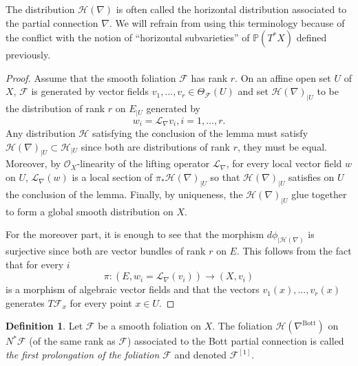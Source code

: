 \documentclass[12pt]{amsart}
\renewcommand{\P}{\mathbb{P}}
\theoremstyle{definition}
\newtheorem{definition}{Definition}[subsection]
\theoremstyle{plain}
\theoremstyle{exampstyle}
\theoremstyle{exampstyle}\newtheorem{thmxbis}{Theorem}
\numberwithin{equation}{section}
\theoremstyle{remark}
\begin{document}
The distribution $\mathcal H(\nabla)$ is often called the horizontal distribution associated to the partial connection $\nabla$. We will refrain from using this terminology because of the conflict with the notion of ``horizontal subvarieties'' of $\P(T^\ast X)$ defined previously.  
\begin{proof}
Assume that the smooth foliation $\mathcal F$ has rank $r$. 
On an affine open set $U$ of $X$, $\mathcal F$ is generated by vector fields $v_1,\ldots, v_r \in \Theta_\mathcal F(U)$ and set $\mathcal H(\nabla)_{\mid U}$ to be the distribution of rank $r$ on $E_{\mid U}$ generated by 
$$w_i = \mathcal L_\nabla v_i, i = 1,\ldots, r.$$
Any distribution $\mathcal H$ satisfying the conclusion of the lemma must satisfy $\mathcal H(\nabla)_{\mid U} \subset \mathcal H_{\mid U}$ since both are distributions of rank $r$, they must be equal. Moreover, by $\mathcal O_X$-linearity of the lifting operator $\mathcal L_\nabla$, for every local vector field $w$ on $U$, $\mathcal L_\nabla(w)$ is a local section of $\pi_\ast \mathcal H(\nabla)_{\mid U}$ so that $\mathcal H(\nabla)_{\mid U}$ satisfies on $U$ the conclusion of the lemma. Finally, by uniqueness, the $\mathcal H(\nabla)_{\mid U}$ glue together to form a global smooth distribution on $X$. 

For the moreover part, it is enough to see that the morphism $d\phi_{\mid \mathcal H(\nabla)}$ is surjective since both are vector bundles of rank $r$ on $E$. This follows from the fact that for every $i$ 
$$\pi: (E,w_i = \mathcal L_\nabla(v_i)) \rightarrow (X,v_i) $$
is a morphism of algebraic vector fields and that the vectors $v_1(x),\ldots, v_r(x)$ generates $T\mathcal F_{x}$ for every point $x \in U$.
\end{proof}

\begin{definition} 
Let $\mathcal F$ be a smooth foliation on $X$. The foliation $\mathcal H(\nabla^{\mathrm{Bott}})$ on $N^\ast \mathcal F$ (of the same rank as $\mathcal F$) associated to the Bott partial connection is called {\em the first prolongation of the foliation $\mathcal F$} and denoted $\mathcal F^{[1]}$.
\end{definition} 
\end{document}
